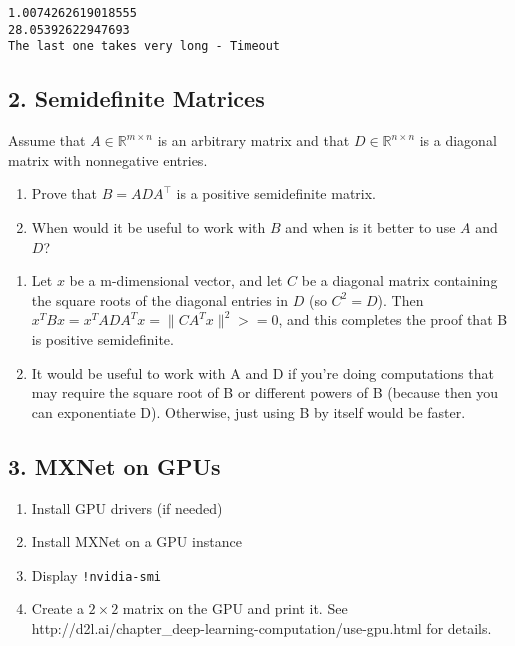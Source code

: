 \documentclass[11pt]{article}
\providecommand{\tightlist}{%
      \setlength{\itemsep}{0pt}\setlength{\parskip}{0pt}}
\begin{document}
    \begin{Verbatim}[commandchars=\\\{\}]
1.0074262619018555
28.05392622947693
The last one takes very long - Timeout

    \end{Verbatim}

    \hypertarget{semidefinite-matrices}{%
\subsection{2. Semidefinite Matrices}\label{semidefinite-matrices}}

Assume that \(A \in \mathbb{R}^{m \times n}\) is an arbitrary matrix and
that \(D \in \mathbb{R}^{n \times n}\) is a diagonal matrix with
nonnegative entries.

\begin{enumerate}
\def\labelenumi{\arabic{enumi}.}
\tightlist
\item
  Prove that \(B = A D A^\top\) is a positive semidefinite matrix.
\item
  When would it be useful to work with \(B\) and when is it better to
  use \(A\) and \(D\)?
\end{enumerate}

    \begin{enumerate}
\def\labelenumi{\arabic{enumi}.}
\item
  Let \(x\) be a m-dimensional vector, and let \(C\) be a diagonal
  matrix containing the square roots of the diagonal entries in \(D\)
  (so \(C^2 = D\)). Then \(x^TBx = x^TADA^Tx = \|CA^Tx\|^2 >= 0\), and
  this completes the proof that B is positive semidefinite.
\item
  It would be useful to work with A and D if you're doing computations
  that may require the square root of B or different powers of B
  (because then you can exponentiate D). Otherwise, just using B by
  itself would be faster.
\end{enumerate}

    \hypertarget{mxnet-on-gpus}{%
\subsection{3. MXNet on GPUs}\label{mxnet-on-gpus}}

\begin{enumerate}
\def\labelenumi{\arabic{enumi}.}
\tightlist
\item
  Install GPU drivers (if needed)
\item
  Install MXNet on a GPU instance
\item
  Display \texttt{!nvidia-smi}
\item
  Create a \(2 \times 2\) matrix on the GPU and print it. See
  http://d2l.ai/chapter\_deep-learning-computation/use-gpu.html for
  details.
\end{enumerate}
\end{document}
